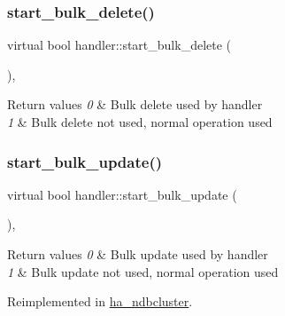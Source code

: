 \subsubsection{\texorpdfstring{start\+\_\+bulk\+\_\+delete()}{start\_bulk\_delete()}}
{\footnotesize\ttfamily virtual bool handler\+::start\+\_\+bulk\+\_\+delete (\begin{DoxyParamCaption}{ }\end{DoxyParamCaption})\hspace{0.3cm}{\ttfamily [inline]}, {\ttfamily [virtual]}}


\begin{DoxyRetVals}{Return values}
{\em 0} & Bulk delete used by handler \\
\hline
{\em 1} & Bulk delete not used, normal operation used \\
\hline
\end{DoxyRetVals}
\mbox{\label{classhandler_a7488245f51aa4676c872bb0564dbe71f}} 
\subsubsection{\texorpdfstring{start\+\_\+bulk\+\_\+update()}{start\_bulk\_update()}}
{\footnotesize\ttfamily virtual bool handler\+::start\+\_\+bulk\+\_\+update (\begin{DoxyParamCaption}{ }\end{DoxyParamCaption})\hspace{0.3cm}{\ttfamily [inline]}, {\ttfamily [virtual]}}


\begin{DoxyRetVals}{Return values}
{\em 0} & Bulk update used by handler \\
\hline
{\em 1} & Bulk update not used, normal operation used \\
\hline
\end{DoxyRetVals}


Reimplemented in \mbox{\hyperlink{classha__ndbcluster_aa852a48bce2fe6fbbe70b83022d74ed2}{ha\+\_\+ndbcluster}}.

\mbox{\label{classhandler_a6cadefb8724982848541e06a394917e8}} 
